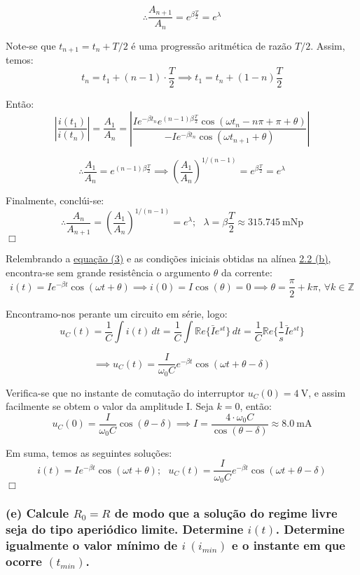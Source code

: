 $$
    \therefore \frac{A_{n+1}}{A_{n}} = e^{\beta \frac{T}{2}} = e^{\lambda}
$$

Note-se que $t_{n+1} = t_n + T/2$ é uma progressão aritmética de razão $T/2$. Assim, temos:
$$
    t_{n} = t_1 + (n-1)\cdot \frac{T}{2} \implies t_1 = t_{n} + (1-n)\frac{T}{2}
$$

Então:
$$
    \left\vert \frac{i(t_{1})}{i(t_{n})} \right\vert = \frac{A_{1}}{A_{n}} = \left\vert \frac{Ie^{-\beta t_{n}}e^{(n-1)\beta\frac{T}{2}}\cos{(\omega t_{n} - n\pi + \pi + \theta)}}{-Ie^{-\beta t_{n}}\cos{(\omega t_{n+1} + \theta)}} \right\vert
$$

$$
    \therefore \frac{A_{1}}{A_{n}} = e^{(n-1)\beta\frac{T}{2}} \implies \left(\frac{A_{1}}{A_{n}}\right)^{1/(n-1)} = e^{\beta\frac{T}{2}} = e^{\lambda} 
$$

Finalmente, conclúi-se:
$$
    \therefore \frac{A_n}{A_{n+1}} = \left(\frac{A_1}{A_n}\right)^{1/(n-1)} = e^{\lambda};\ \ \ \lambda = \beta\frac{T}{2} \approx 315.745\ \text{mNp}
$$
\hfill \ensuremath{\Box}

Relembrando a \hyperref[eq2]{equação (3)} e as condições iniciais obtidas na alínea \hyperref[subsubsec_b2]{\underline{2.2} (b)}, encontra-se sem grande resistência o argumento $\theta$ da corrente:
$$
    i(t) = Ie^{-\beta t}\cos{(\omega t + \theta)} \implies i(0) = I\cos{(\theta)} = 0 \implies \theta = \frac{\pi}{2} + k\pi\text{, }\forall k \in \mathbb{Z} 
$$

Encontramo-nos perante um circuito em série, logo:
$$
    u_C(t) = \frac{1}{C}\int i(t)\, dt = \frac{1}{C}\int \mathbb{R}e\{\bar{I} e^{st} \}\, dt = \frac{1}{C}\mathbb{R}e\{\frac{1}{s}\bar{I} e^{st}\}
$$

$$
    \implies u_C(t) = \frac{I}{\omega_0 C}e^{-\beta t}\cos{(\omega t + \theta - \delta)}
$$

Verifica-se que no instante de comutação do interruptor $u_C(0) = 4\ \text{V}$, e assim facilmente se obtem o valor da amplitude I. Seja $k = 0$, então:
$$
    u_C(0) = \frac{I}{\omega_0 C}\cos{(\theta - \delta)} \implies I = \frac{4 \cdot \omega_0 C}{\cos{(\theta - \delta)}} \approx  8.0\ \text{mA}
$$

Em suma, temos as seguintes soluções:
$$
    i(t) = Ie^{-\beta t}\cos{(\omega t + \theta)};\ \ \ u_C(t) = \frac{I}{\omega_0 C}e^{-\beta t}\cos{(\omega t + \theta - \delta)}
$$
\hfill \ensuremath{\Box}

\clearpage
\subsubsection*{(e) Calcule $R_0 = R$ de modo que a solução do regime livre seja do tipo aperiódico limite. Determine $i(t)$. Determine igualmente o valor mínimo de $i\ (i_{min})$ e o instante em que ocorre $(t_{min})$.}
\label{subsubsec_e2}
